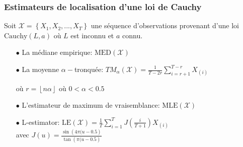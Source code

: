 \documentclass[8pt, sans]{beamer}
\begin{document}
\begin{frame}

\frametitle{Estimateurs de localisation d'une loi de Cauchy}

Soit $\mathcal{X}=\left\{X_1,X_2,...,X_T\right\}$ une séquence d'observations provenant d'une loi $\mathrm{Cauchy}(L,a)$ où $L$ est inconnu et $a$ connu.

\vfill
\pause

\begin{itemize}

\vfill
\item[$\bullet$]
La médiane empirique: $\mathrm{MED}(\mathcal{X})$

\pause
\vfill
\item[$\bullet$]
La moyenne $\alpha-$tronquée: $\displaystyle TM_{\alpha}(\mathcal X)=\frac{1}{T-2r}\sum_{i=r+1}^{T-r}X_{(i)}$

où $r=\left\lfloor n\alpha\right\rfloor$ où $0<\alpha<0.5$ 

\pause
\vfill
\item[$\bullet$]
L'estimateur de maximum de vraisemblance: $\mathrm{MLE}(\mathcal{X})$

\pause
\vfill
\item[$\bullet$]
L-estimator: $\displaystyle\mathrm{LE}(\mathcal{X})=\frac{1}{T}\sum_{i=1}^T J\left(\frac{i}{T+1}\right) X_{(i)}$\\
avec $J(u)=\frac{\sin\left(4\pi(u-0.5\right)}{\tan\left(\pi(u-0.5\right)}$

\end{itemize}

\end{frame}
\end{document}
